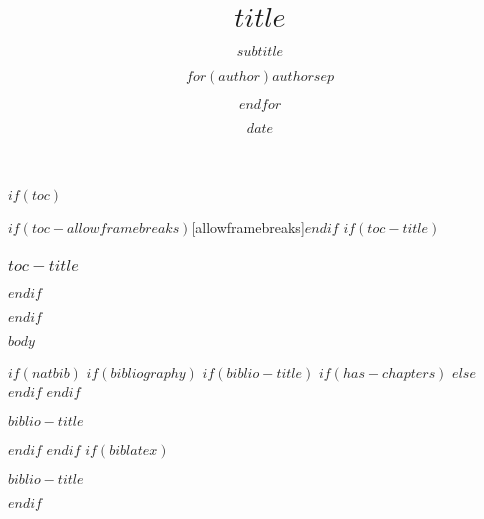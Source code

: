 \documentclass[
  $if(fontsize)$
    $fontsize$,
  $endif$
  $for(classoption)$
    $classoption$$sep$,
  $endfor$
]{beamer}
\title{$title$}
\author{$for(author)$$author$$sep$ \and $endfor$}
\date{$date$}
\subtitle{$subtitle$}
\begin{document}
\frame{\titlepage}

$if(toc)$
  \begin{frame}$if(toc-allowframebreaks)$[allowframebreaks]$endif$
  $if(toc-title)$
    \frametitle{$toc-title$}
  $endif$
  \tableofcontents[hideallsubsections]
  \end{frame}
$endif$

$body$

$if(natbib)$
  $if(bibliography)$
    $if(biblio-title)$
      $if(has-chapters)$
        \renewcommand\bibname{$biblio-title$}
      $else$
        \renewcommand\refname{$biblio-title$}
      $endif$
    $endif$
    \begin{frame}[allowframebreaks]{$biblio-title$}
    \bibliographytrue
    
    \end{frame}
  $endif$
$endif$
$if(biblatex)$
  \begin{frame}[allowframebreaks]{$biblio-title$}
  \bibliographytrue
  \printbibliography[heading=none]
  \end{frame}
$endif$
\end{document}
